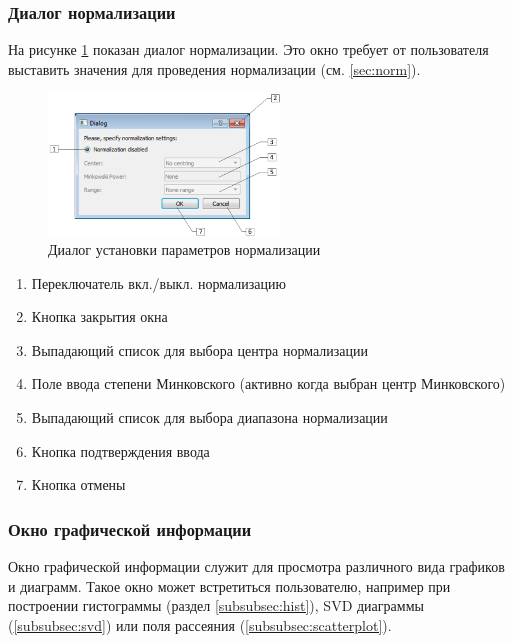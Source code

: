 \documentclass[12pt,twoside,a4paper,tikz,border=5]{refart}
\begin{document}
\subsubsection{Диалог нормализации}

На рисунке \ref{fig:normdialog} показан диалог нормализации. Это окно требует от пользователя выставить значения для проведения нормализации (см. \ref{sec:norm}). 

\begin{figure}[h!]
	\centering
	\includegraphics[width=0.55\textwidth]{img/normdialog}
	\caption{Диалог установки параметров нормализации}
	\label{fig:normdialog}
\end{figure}

\begin{enumerate}
	\item Переключатель вкл./выкл. нормализацию
	\item Кнопка закрытия окна
	\item Выпадающий список для выбора центра нормализации
	\item Поле ввода степени Минковского (активно когда выбран центр Минковского)
	\item Выпадающий список для выбора диапазона нормализации
	\item Кнопка подтверждения ввода
	\item Кнопка отмены
\end{enumerate}

\subsubsection{Окно графической информации}

Окно графической информации служит для просмотра различного вида графиков и диаграмм. Такое окно может встретиться пользователю, например при построении гистограммы (раздел \ref{subsubsec:hist}), SVD диаграммы (\ref{subsubsec:svd}) или поля рассеяния (\ref{subsubsec:scatterplot}).
\end{document}
